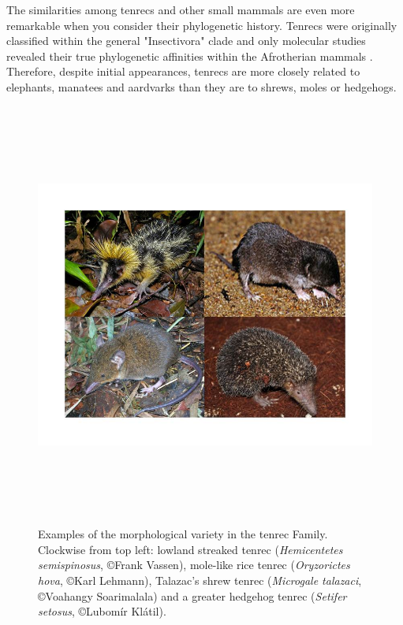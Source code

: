 	The similarities among tenrecs and other small mammals are even more remarkable when you consider their phylogenetic history. Tenrecs were originally classified within the general "Insectivora" clade and only molecular studies revealed their true phylogenetic affinities within the Afrotherian mammals \citep{Stanhope1998}. Therefore, despite initial appearances, tenrecs are more closely related to elephants, manatees and aardvarks than they are to shrews, moles or hedgehogs. 
\begin{figure}[h] 
  \centering
  \includegraphics[width=14cm, height=14cm, keepaspectratio=true]{Introduction/FourTenrecs.jpg}
    \caption[Examples of tenrec species]
    {Examples of the morphological variety in the tenrec Family. Clockwise from top left: lowland streaked tenrec (\textit{Hemicentetes semispinosus}, \copyright Frank Vassen), mole-like rice tenrec (\textit{Oryzorictes hova}, \copyright Karl Lehmann), Talazac's shrew tenrec (\textit{Microgale talazaci}, \copyright Voahangy Soarimalala) and a greater hedgehog tenrec (\textit{Setifer setosus}, \copyright Lubom\'{i}r Kl\'{a}til).}
  \label{fig:tenrecs}
  \end{figure}
  
